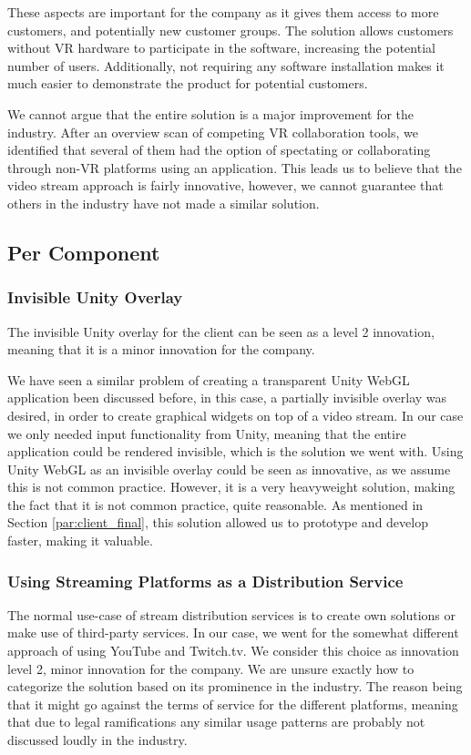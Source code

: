 These aspects are important for the company as it gives them access to more customers, and potentially new customer groups. The solution allows customers without VR hardware to participate in the software, increasing the potential number of users. Additionally, not requiring any software installation makes it much easier to demonstrate the product for potential customers.

We cannot argue that the entire solution is a major improvement for the industry. After an overview scan of competing VR collaboration tools, we identified that several of them had the option of spectating or collaborating through non-VR platforms using an application. This leads us to believe that the video stream approach is fairly innovative, however, we cannot guarantee that others in the industry have not made a similar solution.

\subsection{Per Component}
\subsubsection{Invisible Unity Overlay}
The invisible Unity overlay for the client can be seen as a level 2 innovation, meaning that it is a minor innovation for the company\cite{nrcs}. 

We have seen a similar problem of creating a transparent Unity WebGL application been discussed before\cite{unity_transparent_webgl}, in this case, a partially invisible overlay was desired, in order to create graphical widgets on top of a video stream\cite{unity_forum_partially_invisible}. In our case we only needed input functionality from Unity, meaning that the entire application could be rendered invisible, which is the solution we went with. Using Unity WebGL as an invisible overlay could be seen as innovative, as we assume this is not common practice. However, it is a very heavyweight solution, making the fact that it is not common practice, quite reasonable. As mentioned in Section \ref{par:client_final}, this solution allowed us to prototype and develop faster, making it valuable.

\subsubsection{Using Streaming Platforms as a Distribution Service}
The normal use-case of stream distribution services is to create own solutions or make use of third-party services. In our case, we went for the somewhat different approach of using YouTube and Twitch.tv. We consider this choice as innovation level 2, minor innovation for the company\cite{nrcs}. We are unsure exactly how to categorize the solution based on its prominence in the industry. The reason being that it might go against the terms of service for the different platforms, meaning that due to legal ramifications any similar usage patterns are probably not discussed loudly in the industry. 
